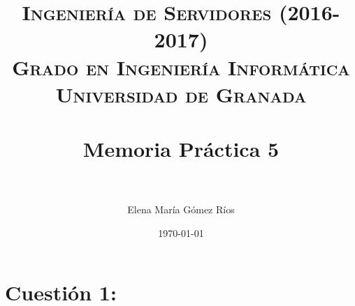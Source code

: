 


\title{	
\normalfont \normalsize 
\textsc{\textbf{Ingeniería de Servidores (2016-2017)} \\ Grado en Ingeniería Informática \\ Universidad de Granada} \\ [25pt] %
\horrule{0.5pt} \\[0.4cm] %
\huge Memoria Práctica 5 \\ %
\horrule{2pt} \\[0.5cm] %
}

\author{Elena María Gómez Ríos} %

\date{\normalsize\today} %




\maketitle %

\newpage %

\tableofcontents %

\listoffigures

\listoftables

\newpage

 


\newpage


\section{Cuestión 1:}

